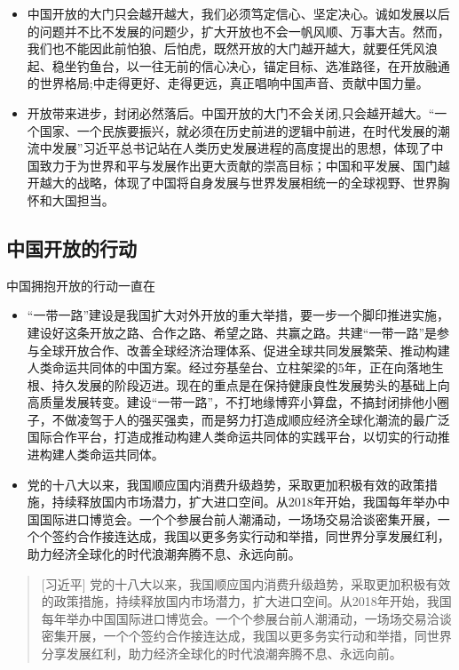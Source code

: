 \documentclass[10pt,aspectratio=169,english,fontset=none]{beamer}
\begin{document}
\begin{frame}
    \begin{itemize}[<+-|alert@+>]
        \item 中国开放的大门只会越开越大，我们必须笃定信心、坚定决心。诚如发展以后的问题并不比不发展的问题少，扩大开放也不会一帆风顺、万事大吉。然而，我们也不能因此前怕狼、后怕虎，既然开放的大门越开越大，就要任凭风浪起、稳坐钓鱼台，以一往无前的信心决心，锚定目标、选准路径，在开放融通的世界格局;中走得更好、走得更远，真正唱响中国声音、贡献中国力量。
        \item 开放带来进步，封闭必然落后。中国开放的大门不会关闭,只会越开越大。“一个国家、一个民族要振兴，就必须在历史前进的逻辑中前进，在时代发展的潮流中发展”习近平总书记站在人类历史发展进程的高度提出的思想，体现了中国致力于为世界和平与发展作出更大贡献的崇高目标；中国和平发展、国门越开越大的战略，体现了中国将自身发展与世界发展相统一的全球视野、世界胸怀和大国担当。
    \end{itemize}
\end{frame}
\subsection{中国开放的行动}

\begin{frame}[fragile]{中国拥抱开放的行动一直在}
\begin{itemize}[<+-|alert@+>]
    \item “一带一路”建设是我国扩大对外开放的重大举措，要一步一个脚印推进实施，建设好这条开放之路、合作之路、希望之路、共赢之路。共建“一带一路”是参与全球开放合作、改善全球经济治理体系、促进全球共同发展繁荣、推动构建人类命运共同体的中国方案。经过夯基垒台、立柱架梁的5年，正在向落地生根、持久发展的阶段迈进。现在的重点是在保持健康良性发展势头的基础上向高质量发展转变。建设“一带一路”，不打地缘博弈小算盘，不搞封闭排他小圈子，不做凌驾于人的强买强卖，而是努力打造成顺应经济全球化潮流的最广泛国际合作平台，打造成推动构建人类命运共同体的实践平台，以切实的行动推进构建人类命运共同体。
    \item 党的十八大以来，我国顺应国内消费升级趋势，采取更加积极有效的政策措施，持续释放国内市场潜力，扩大进口空间。从2018年开始，我国每年举办中国国际进口博览会。一个个参展台前人潮涌动，一场场交易洽谈密集开展，一个个签约合作接连达成，我国以更多务实行动和举措，同世界分享发展红利，助力经济全球化的时代浪潮奔腾不息、永远向前。
\end{itemize}
    

\end{frame}

\begin{frame}
\pause[1] \begin{quotation}[习近平]
    党的十八大以来，我国顺应国内消费升级趋势，采取更加积极有效的政策措施，持续释放国内市场潜力，扩大进口空间。从2018年开始，我国每年举办中国国际进口博览会。一个个参展台前人潮涌动，一场场交易洽谈密集开展，一个个签约合作接连达成，我国以更多务实行动和举措，同世界分享发展红利，助力经济全球化的时代浪潮奔腾不息、永远向前。
\end{quotation}
    

\end{frame}
\end{document}
